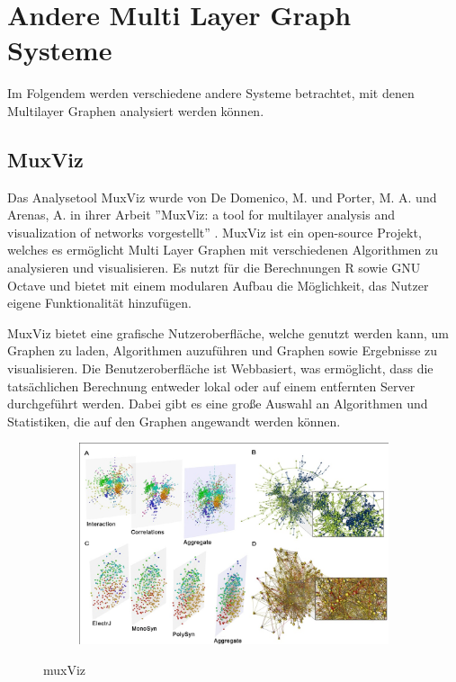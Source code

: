 \section{Andere Multi Layer Graph Systeme}

Im Folgendem werden verschiedene andere Systeme betrachtet, mit denen Multilayer Graphen analysiert werden können.

\subsection{MuxViz}

Das Analysetool MuxViz wurde von De Domenico, M. und Porter, M. A. und Arenas, A. in ihrer Arbeit ''MuxViz: a tool for multilayer analysis and visualization of networks vorgestellt'' \cite{De_Domenico_2014}.
MuxViz ist ein open-source Projekt, welches es ermöglicht Multi Layer Graphen mit verschiedenen Algorithmen zu analysieren und visualisieren. Es nutzt für die Berechnungen R sowie GNU Octave und bietet mit einem modularen Aufbau die Möglichkeit, das Nutzer eigene Funktionalität hinzufügen.


MuxViz bietet eine grafische Nutzeroberfläche, welche genutzt werden kann, um Graphen zu laden, Algorithmen auzuführen und Graphen sowie Ergebnisse zu visualisieren. Die Benutzeroberfläche ist Webbasiert, was ermöglicht, dass die tatsächlichen Berechnung entweder lokal oder auf einem entfernten Server durchgeführt werden.
Dabei gibt es eine große Auswahl an Algorithmen und Statistiken, die auf den Graphen angewandt werden können.


\begin{figure}
  \centering
  \begin{subfigure}[b]{1.0\textwidth}
    \includegraphics[width=1.0\linewidth]{img/muxViz.png}
  \end{subfigure}
  \caption{muxViz}
  \label{muxVizSample}
\end{figure}

